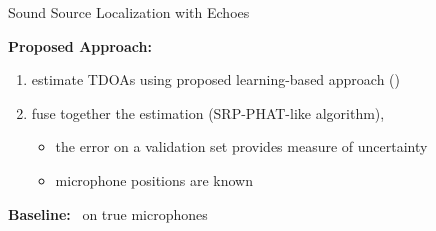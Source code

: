 \begin{frame}{Sound Source Localization \alert{with Echoes} \hfill\faMapMarked*}
    \begin{mycontriblock}
        \textbf{Proposed Approach:}
        \begin{enumerate}
            \item estimate \alert{TDOAs} using proposed learning-based approach (\MLP)
            \item fuse together the estimation (SRP-PHAT-like algorithm\footnotemark[1]),
            \begin{itemize}
                \item the error on a validation set provides measure of uncertainty
                \item microphone positions are known
            \end{itemize}
        \end{enumerate}
    \end{mycontriblock}

    \vspace{1mm}
    \begin{mysotablock}
        \textbf{Baseline:} \GCCPHAT~on true microphones\footnotemark[2]
    \end{mysotablock}

    \vspace{1mm}

\end{frame}

